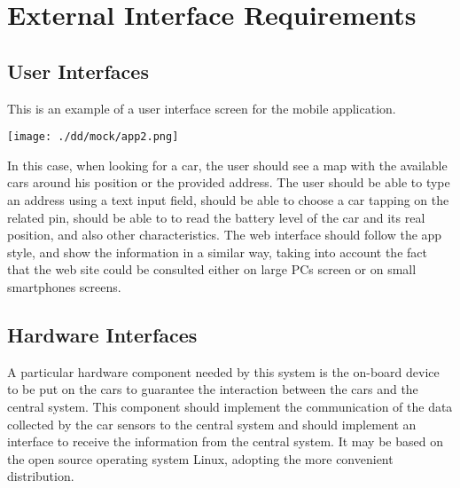 \documentclass{scrreprt}
\begin{document}
\chapter{External Interface Requirements}

\section{User Interfaces}
This is an example of a user interface screen for the mobile application.
\begin{center}
\texttt{[image: ./dd/mock/app2.png]}
\end{center}
In this case, when looking for a car, the user should see a map with the available cars around his position or the provided address. The user should be able to type an address using a text input field, should be able to choose a car tapping on the related pin, should be able to to read the battery level of the car and its real position, and also other characteristics.
The web interface should follow the app style, and show the information in a similar way, taking into account the fact that the web site could be consulted either on large PCs screen or on small smartphones screens.
\begin{comment}$<$Describe the logical characteristics of each interface between the software 
product and the users. This may include sample screen images, any GUI standards 
or product family style guides that are to be followed, screen layout 
constraints, standard buttons and functions (e.g., help) that will appear on 
every screen, keyboard shortcuts, error message display standards, and so on.  
Define the software components for which a user interface is needed. Details of 
the user interface design should be documented in a separate user interface 
specification.$>$
\end{comment}

\section{Hardware Interfaces}
A particular hardware component needed by this system is the on-board device to be put on the cars to guarantee the interaction between the cars and the central system.
This component should implement the communication of the data collected by the car sensors to the central system and should implement an interface to receive the information from the central system.
It may be based on the open source operating system Linux, adopting the more convenient distribution.
\begin{comment}$<$Describe the logical and physical characteristics of each interface between 
the software product and the hardware components of the system. This may include 
the supported device types, the nature of the data and control interactions 
between the software and the hardware, and communication protocols to be 
used.$>$
\end{comment}
\end{document}
